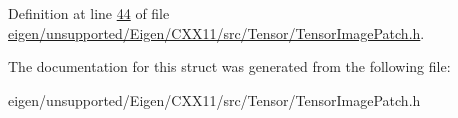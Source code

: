 Definition at line \hyperlink{eigen_2unsupported_2_eigen_2_c_x_x11_2src_2_tensor_2_tensor_image_patch_8h_source_l00044}{44} of file \hyperlink{eigen_2unsupported_2_eigen_2_c_x_x11_2src_2_tensor_2_tensor_image_patch_8h_source}{eigen/unsupported/\+Eigen/\+C\+X\+X11/src/\+Tensor/\+Tensor\+Image\+Patch.\+h}.



The documentation for this struct was generated from the following file\+:\begin{DoxyCompactItemize}
\item 
eigen/unsupported/\+Eigen/\+C\+X\+X11/src/\+Tensor/\+Tensor\+Image\+Patch.\+h\end{DoxyCompactItemize}
